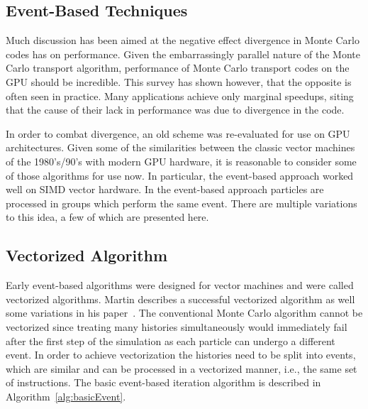 \subsection{\textbf{Event-Based Techniques}}
\label{sec:EventBased}

Much discussion has been aimed at the negative effect divergence in Monte Carlo codes has on  performance.
%
Given the embarrassingly parallel nature of the Monte Carlo transport algorithm, performance of Monte Carlo transport codes on the GPU should be incredible.
%
This survey has shown however, that the opposite is often seen in practice.
%
Many applications achieve only marginal speedups, siting that the cause of their lack in performance was due to divergence in the code.
%

%
In order to combat divergence, an old scheme was re-evaluated for use on GPU architectures.
%
Given some of the similarities between the classic vector machines of the 1980's/90's with modern GPU hardware, it is reasonable to consider some of those algorithms for use now.
%
In particular, the event-based approach worked well on SIMD vector hardware.
%
In the event-based approach particles are processed in groups which perform the same event.
%
There are multiple variations to this idea, a few of which are presented here.
%

\subsection*{\textbf{Vectorized Algorithm}}

%
Early event-based algorithms were designed for vector machines and were called vectorized algorithms.
%
Martin describes a successful vectorized algorithm as well some variations in his paper~\cite{martin1989successful}.
%
The conventional Monte Carlo algorithm cannot be vectorized since treating many histories simultaneously would immediately fail after the first step of the simulation as each particle can undergo a different event.
%
In order to achieve vectorization the histories need to be split into events, which are similar and can be processed in a vectorized manner, i.e., the same set of instructions.
%
The basic event-based iteration algorithm is described in Algorithm~\ref{alg:basicEvent}.
%

